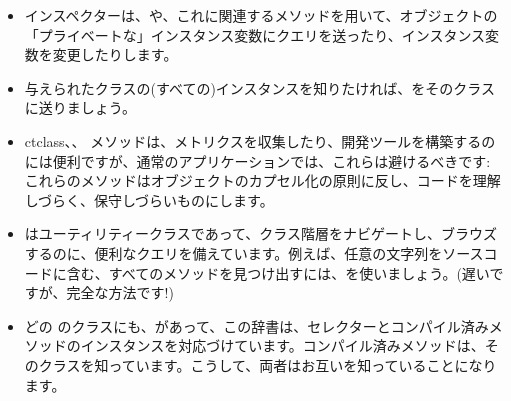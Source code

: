 \documentclass[a4paper,10pt,twoside]{book}
\begin{document}
\begin{itemize}
\item インスペクターは、や、これに関連するメソッドを用いて、オブジェクトの「プライベートな」インスタンス変数にクエリを送ったり、インスタンス変数を変更したりします。
\item 与えられたクラスの(すべての)インスタンスを知りたければ、をそのクラスに送りましょう。
\item ct{class}、、 \etc メソッドは、メトリクスを収集したり、開発ツールを構築するのには便利ですが、通常のアプリケーションでは、これらは避けるべきです: これらのメソッドはオブジェクトのカプセル化の原則に反し、コードを理解しづらく、保守しづらいものにします。
\item {}はユーティリティークラスであって、クラス階層をナビゲートし、ブラウズするのに、便利なクエリを備えています。例えば、任意の文字列をソースコードに含む、すべてのメソッドを見つけ出すには、を使いましょう。(遅いですが、完全な方法です!) %
\item どの \st{}のクラスにも、があって、この辞書は、セレクターとコンパイル済みメソッドのインスタンスを対応づけています。コンパイル済みメソッドは、そのクラスを知っています。こうして、両者はお互いを知っていることになります。

\end{itemize}
\end{document}
